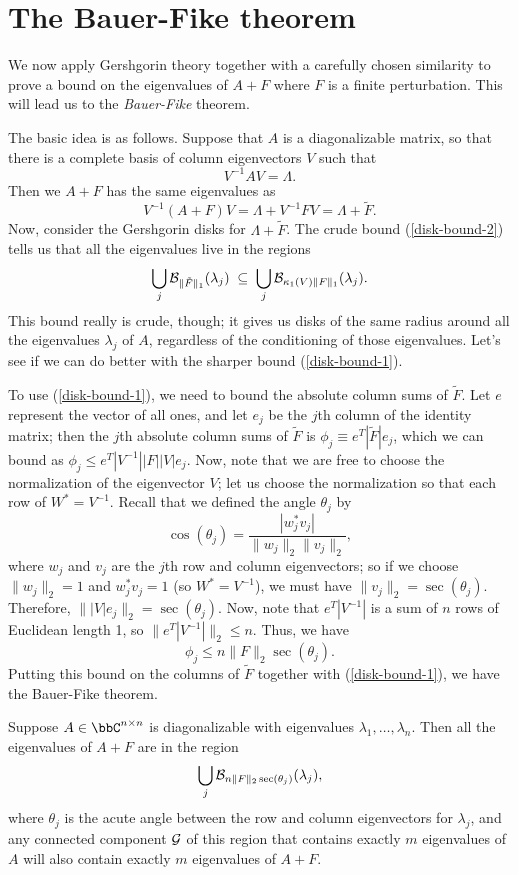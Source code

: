 \section{The Bauer-Fike theorem}

We now apply Gershgorin theory together with a carefully chosen
similarity to prove a bound on the eigenvalues of $A+F$ where $F$ is a
finite perturbation.  This will lead us to the {\em Bauer-Fike} theorem.

The basic idea is as follows.  Suppose that $A$ is a diagonalizable matrix, so
that there is a complete basis of column eigenvectors $V$ such that
\[
  V^{-1} A V = \Lambda.
\]
Then we $A+F$ has the same eigenvalues as
\[
  V^{-1} (A+F) V = \Lambda + V^{-1} F V = \Lambda + \tilde{F}.
\]
Now, consider the Gershgorin disks for $\Lambda + \tilde{F}$.
The crude bound (\ref{disk-bound-2}) tells us
that all the eigenvalues live in the regions
\[
  \bigcup_j \mathcal{B}_{\|\tilde{F}\|_1}(\lambda_j) \; \subseteq \;
  \bigcup_j \mathcal{B}_{\kappa_1(V) \|F\|_1}(\lambda_j).
\]
This bound really is crude, though; it gives us disks of the
same radius around all the eigenvalues $\lambda_j$ of $A$,
regardless of the conditioning of those eigenvalues.  Let's
see if we can do better with the sharper bound (\ref{disk-bound-1}).

To use (\ref{disk-bound-1}), we need to bound
the absolute column sums of $\tilde{F}$.  Let $e$ represent
the vector of all ones, and let $e_j$ be the $j$th column of
the identity matrix; then the $j$th absolute column sums of $\tilde{F}$
is $\phi_j \equiv e^T |\tilde{F}| e_j$, which we can bound
as $\phi_j \leq e^T |V^{-1}| |F| |V| e_j$.  Now, note that we
are free to choose the normalization of the eigenvector $V$;
let us choose the normalization so that each row of $W^* = V^{-1}$.
Recall that we defined the angle $\theta_j$ by
\[
  \cos(\theta_j) = \frac{|w_j^* v_j|}{\|w_j\|_2 \|v_j\|_2},
\]
where $w_j$ and $v_j$ are the $j$th row and column eigenvectors;
so if we choose $\|w_j\|_2 = 1$ and $w_j^* v_j = 1$ (so $W^* = V^{-1}$),
we must have $\|v_j\|_2 = \sec(\theta_j)$.  Therefore,
$\||V| e_j\|_2 = \sec(\theta_j)$.  Now, note that $e^T |V^{-1}|$ is
a sum of $n$ rows of Euclidean length 1, so $\|e^T |V^{-1}|\|_2 \leq n$.
Thus, we have
\[
  \phi_j \leq n \|F\|_2 \sec(\theta_j).
\]
Putting this bound on the columns of $\tilde{F}$ together with
(\ref{disk-bound-1}), we have the Bauer-Fike theorem.

\begin{theorem}
  Suppose $A \in \bbC^{n \times n}$ is diagonalizable with
  eigenvalues $\lambda_1, \ldots, \lambda_n$.
  Then all the eigenvalues of $A+F$ are in the region
  \[
    \bigcup_j \mathcal{B}_{n \|F\|_2 \sec(\theta_j)}(\lambda_j),
  \]
  where $\theta_j$ is the acute angle between the row and column eigenvectors
  for $\lambda_j$, and any connected component $\mathcal{G}$ of this region that
  contains exactly $m$ eigenvalues of $A$ will also contain exactly $m$
  eigenvalues of $A+F$.
\end{theorem}
